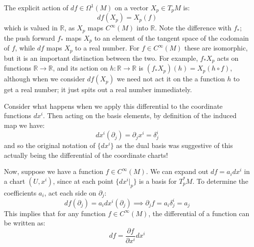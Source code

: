 \documentclass[11pt, oneside]{article}   	%
\theoremstyle{definition}
\begin{document}
The explicit action of $df\in\Omega^1(M)$ on a vector $X_p\in T_pM$ is:
\begin{equation}
	df(X_p) = X_p(f)
\end{equation}
which is valued in $\mathbb R$, as $X_p$ maps $C^\infty(M)$ into $\mathbb R$. Note the difference with $f_*$; the 
push forward $f_*$ maps $X_p$ to an element of the tangent space of the codomain of $f$, while $df$ maps $X_p$ to 
a real number. For $f\in C^\infty(M)$ these are isomorphic, but it is an important distinction between the two. For example, 
$f_* X_p$ acts on functions $\mathbb R\rightarrow\mathbb R$, and its action on $h : \mathbb R\rightarrow\mathbb R$ is 
$(f_* X_p)(h) = X_p(h\circ f)$, although when we consider $df (X_p)$ we need not act it on the a function $h$ to get a 
real number; it just spits out a real number immediately.


Consider what happens when we apply this differential to the coordinate 
functions $dx^i$. Then acting on the basis elements, by definition of the induced map we have:
\begin{equation}
	dx^i(\partial_j) = \partial_j x^i = \delta^i_j
\end{equation}
and so the original notation of $\{dx^i\}$ as the dual basis was suggestive of this actually being the differential 
of the coordinate charts! 

Now, suppose we have a function $f\in C^\infty(M)$. We can expand out $df = a_i dx^i$ in a chart $(U, x^i)$, since at 
each point $\{dx^i|_p\}$ is a basis for $T_p^* M$. To determine the coefficients $a_i$, act each side on $\partial_j$:
\begin{equation}
	df(\partial_j) = a_i dx^i(\partial_j)\implies \partial_j f = a_i\delta^i_j = a_j
\end{equation}
This implies that for any function $f\in C^\infty(M)$, the differential of a function can be written as:
\begin{equation}
	df = \frac{\partial f}{\partial x^i}dx^i
\end{equation}
\end{document}
